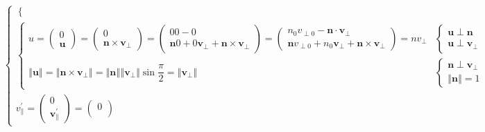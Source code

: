 \documentclass[
]{book}
\theoremstyle{definition}
\theoremstyle{definition}
\theoremstyle{definition}
\theoremstyle{definition}
\theoremstyle{remark}
\begin{document}
\[\begin{aligned}
\begin{cases}
\begin{cases}
\end{cases}\\
\begin{cases}
u=\begin{pmatrix}0\\
\boldsymbol{u}
\end{pmatrix}=\begin{pmatrix}0\\
\boldsymbol{n}\times\boldsymbol{v}_{{\scriptscriptstyle \perp}}
\end{pmatrix}=\begin{pmatrix}00-0\\
\boldsymbol{n}0+0\boldsymbol{v}_{{\scriptscriptstyle \perp}}+\boldsymbol{n}\times\boldsymbol{v}_{{\scriptscriptstyle \perp}}
\end{pmatrix}=\begin{pmatrix}n_{{\scriptscriptstyle 0}}v_{{\scriptscriptstyle \perp}0}-\boldsymbol{n}\cdot\boldsymbol{v}_{{\scriptscriptstyle \perp}}\\
\boldsymbol{n}v_{{\scriptscriptstyle \perp}0}+n_{{\scriptscriptstyle 0}}\boldsymbol{v}_{{\scriptscriptstyle \perp}}+\boldsymbol{n}\times\boldsymbol{v}_{{\scriptscriptstyle \perp}}
\end{pmatrix}=nv_{{\scriptscriptstyle \perp}} & \begin{cases}
\boldsymbol{u}\perp\boldsymbol{n}\\
\boldsymbol{u}\perp\boldsymbol{v}_{{\scriptscriptstyle \perp}}
\end{cases}\\
\left\Vert \boldsymbol{u}\right\Vert =\left\Vert \boldsymbol{n}\times\boldsymbol{v}_{{\scriptscriptstyle \perp}}\right\Vert =\left\Vert \boldsymbol{n}\right\Vert \left\Vert \boldsymbol{v}_{{\scriptscriptstyle \perp}}\right\Vert \sin\dfrac{\pi}{2}=\left\Vert \boldsymbol{v}_{{\scriptscriptstyle \perp}}\right\Vert  & \begin{cases}
\boldsymbol{n}\perp\boldsymbol{v}_{{\scriptscriptstyle \perp}}\\
\left\Vert \boldsymbol{n}\right\Vert =1
\end{cases}
\end{cases}\\
v_{{\scriptscriptstyle \parallel}}^{\prime}=\begin{pmatrix}0\\
\boldsymbol{v}_{{\scriptscriptstyle \parallel}}^{\prime}
\end{pmatrix}=\begin{pmatrix}0\\

\end{pmatrix}
\end{cases}
\end{aligned}\]
\end{document}
